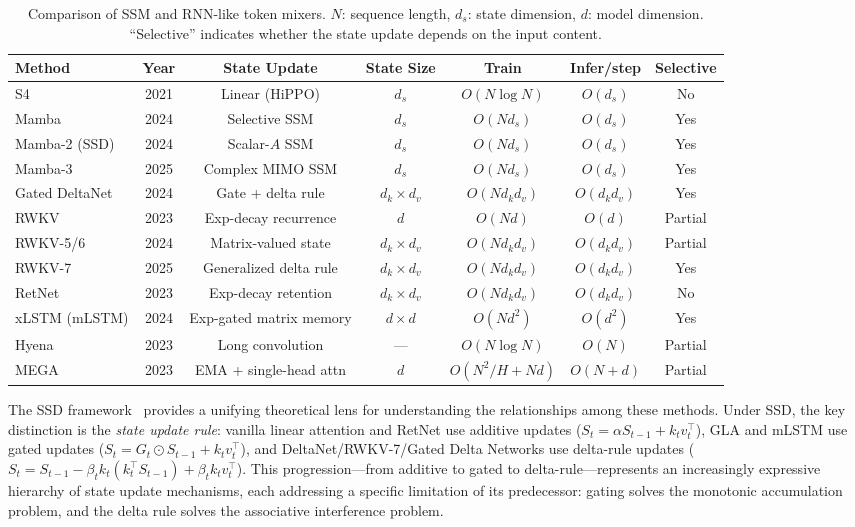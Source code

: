 \begin{table}[t]
\centering
\caption{Comparison of SSM and RNN-like token mixers. $N$: sequence length, $d_s$: state dimension, $d$: model dimension. ``Selective'' indicates whether the state update depends on the input content.}
\label{tab:ssm-comparison}
\small
\begin{tabular}{lcccccc}
\toprule
\textbf{Method} & \textbf{Year} & \textbf{State Update} & \textbf{State Size} & \textbf{Train} & \textbf{Infer/step} & \textbf{Selective} \\
\midrule
S4             & 2021 & Linear (HiPPO) & $d_s$ & $O(N \log N)$ & $O(d_s)$ & No \\
Mamba          & 2024 & Selective SSM & $d_s$ & $O(Nd_s)$ & $O(d_s)$ & Yes \\
Mamba-2 (SSD)  & 2024 & Scalar-$A$ SSM & $d_s$ & $O(Nd_s)$ & $O(d_s)$ & Yes \\
Mamba-3        & 2025 & Complex MIMO SSM & $d_s$ & $O(Nd_s)$ & $O(d_s)$ & Yes \\
Gated DeltaNet & 2024 & Gate + delta rule & $d_k {\times} d_v$ & $O(Nd_k d_v)$ & $O(d_k d_v)$ & Yes \\
RWKV           & 2023 & Exp-decay recurrence & $d$ & $O(Nd)$ & $O(d)$ & Partial \\
RWKV-5/6       & 2024 & Matrix-valued state & $d_k {\times} d_v$ & $O(Nd_k d_v)$ & $O(d_k d_v)$ & Partial \\
RWKV-7         & 2025 & Generalized delta rule & $d_k {\times} d_v$ & $O(Nd_k d_v)$ & $O(d_k d_v)$ & Yes \\
RetNet         & 2023 & Exp-decay retention & $d_k {\times} d_v$ & $O(Nd_k d_v)$ & $O(d_k d_v)$ & No \\
xLSTM (mLSTM)  & 2024 & Exp-gated matrix memory & $d {\times} d$ & $O(Nd^2)$ & $O(d^2)$ & Yes \\
Hyena          & 2023 & Long convolution & --- & $O(N \log N)$ & $O(N)$ & Partial \\
MEGA           & 2023 & EMA + single-head attn & $d$ & $O(N^2/H{+}Nd)$ & $O(N{+}d)$ & Partial \\
\bottomrule
\end{tabular}
\end{table}

The SSD framework~\cite{dao2024transformers} provides a unifying theoretical lens for understanding the relationships among these methods. Under SSD, the key distinction is the \emph{state update rule}: vanilla linear attention and RetNet use additive updates ($S_t = \alpha S_{t-1} + k_t v_t^\top$), GLA and mLSTM use gated updates ($S_t = G_t \odot S_{t-1} + k_t v_t^\top$), and DeltaNet/RWKV-7/Gated Delta Networks use delta-rule updates ($S_t = S_{t-1} - \beta_t k_t(k_t^\top S_{t-1}) + \beta_t k_t v_t^\top$). This progression---from additive to gated to delta-rule---represents an increasingly expressive hierarchy of state update mechanisms, each addressing a specific limitation of its predecessor: gating solves the monotonic accumulation problem, and the delta rule solves the associative interference problem.

